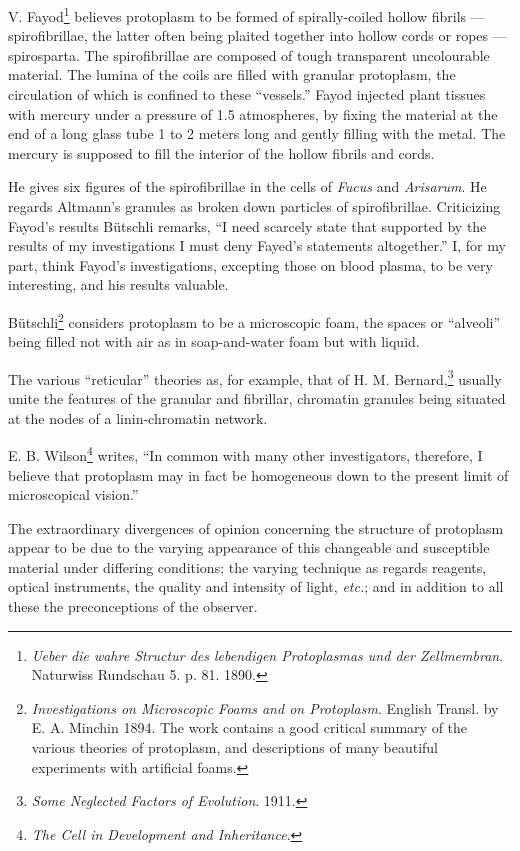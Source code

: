 \documentclass[a4paper, 12pt, oneside]{article}
\begin{document}
V. Fayod\footnote{\emph{Ueber die wahre Structur des lebendigen Protoplasmas und der Zellmembran}. Naturwiss Rundschau 5. p. 81. 1890.} believes protoplasm to be formed of spirally-coiled hollow fibrils --- spirofibrillae, the latter often being plaited together into hollow cords or ropes --- spirosparta. The spirofibrillae are composed of tough transparent uncolourable material. The lumina of the coils are filled with granular protoplasm, the circulation of which is confined to these ``vessels.'' Fayod injected plant tissues with mercury under a pressure of 1.5 atmospheres, by fixing the material at the end of a long glass tube 1 to 2 meters long and gently filling with the metal. The mercury is supposed to fill the interior of the hollow fibrils and cords.

He gives six figures of the spirofibrillae in the cells of \emph{Fucus} and \emph{Arisarum}. He regards Altmann's granules as broken down particles of spirofibrillae. Criticizing Fayod's results Bütschli remarks, ``I need scarcely state that supported by the results of my investigations I must deny Fayed's statements altogether.'' I, for my part, think Fayod's investigations, excepting those on blood plasma, to be very interesting, and his results valuable.

Bütschli\footnote{\emph{Investigations on Microscopic Foams and on Protoplasm}. English Transl. by E. A. Minchin 1894. The work contains a good critical summary of the various theories of protoplasm, and descriptions of many beautiful experiments with artificial foams.} considers protoplasm to be a microscopic foam, the spaces or ``alveoli'' being filled not with air as in soap-and-water foam but with liquid.

The various ``reticular'' theories as, for example, that of H. M. Bernard,\footnote{\emph{Some Neglected Factors of Evolution}. 1911.} usually unite the features of the granular and fibrillar, chromatin granules being situated at the nodes of a linin-chromatin network.

E. B. Wilson\footnote{\emph{The Cell in Development and Inheritance}.} writes, ``In common with many other investigators, therefore, I believe that protoplasm may in fact be homogeneous down to the present limit of microscopical vision.''

The extraordinary divergences of opinion concerning the structure of protoplasm appear to be due to the varying appearance of this changeable and susceptible material under differing conditions; the varying technique as regards reagents, optical instruments, the quality and intensity of light, \emph{etc.}; and in addition to all these the preconceptions of the observer.
\end{document}
